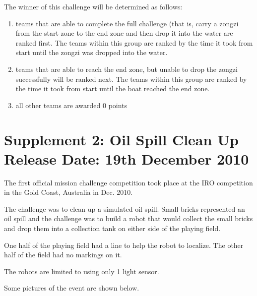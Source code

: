 \documentclass[12pt]{hurocup}
\begin{document}

\begin{lawlist}[DBC]

\item \label{dbc-winner} The winner of this challenge will be
  determined as follows:
  \begin{enumerate}
    \item teams that are able to complete the full challenge (that is,
      carry a zongzi from the start zone to the end zone and then drop
      it into the water are ranked first. The teams within this group
      are ranked by the time it took from start until the zongzi was
      dropped into the water.
    \item teams that are able to reach the end zone, but unable to
      drop the zongzi successfully will be ranked next. The teams
      within this group are ranked by the time it took from start
      until the boat reached the end zone.
    \item all other teams are awarded 0 points
  \end{enumerate}

\end{lawlist}

\newpage
\section{Supplement 2: Oil Spill Clean Up\\Release Date: 19th December 2010}
\label{sec:supp-oil-spill-clean-up}

The first official mission challenge competition took place at the IRO
competition in the Gold Coast, Australia in Dec. 2010.

The challenge was to clean up a simulated oil spill. Small bricks
represented an oil spill and the challenge was to build a robot that
would collect the small bricks and drop them into a collection tank on
either side of the playing field.

One half of the playing field had a line to help the robot to
localize. The other half of the field had no markings on it.

The robots are limited to using only 1 light sensor.

Some pictures of the event are shown below.
\end{document}
